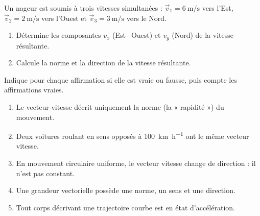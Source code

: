 \documentclass[11pt,a4paper]{article}
\newcommand{\vv}[1]{\vec{#1}}\newcommand{\ds}{\displaystyle}
\begin{document}
\begin{exo}
Un nageur est soumis à trois vitesses simultanées : $\vv{v}_1=\qty{6}{\metre\per\second}$ vers l'Est,
$\vv{v}_2=\qty{2}{\metre\per\second}$ vers l'Ouest et $\vv{v}_3=\qty{3}{\metre\per\second}$ vers le Nord.
\begin{enumerate}[label=\alph*)]
  \item Détermine les composantes $v_x$ (Est$-$Ouest) et $v_y$ (Nord) de la vitesse résultante.
  \item Calcule la norme et la direction de la vitesse résultante.
\end{enumerate}
\end{exo}

\begin{exo}
Indique pour chaque affirmation si elle est vraie ou fausse, puis compte les affirmations vraies.
\begin{enumerate}[label=\alph*)]
  \item Le vecteur vitesse décrit uniquement la norme (la « rapidité ») du mouvement.
  \item Deux voitures roulant en sens opposés à \qty{100}{\kilo\metre\per\hour} ont le même vecteur vitesse.
  \item En mouvement circulaire uniforme, le vecteur vitesse change de direction : il n'est pas constant.
  \item Une grandeur vectorielle possède une norme, un sens et une direction.
  \item Tout corps décrivant une trajectoire courbe est en état d'accélération.
\end{enumerate}
\end{exo}
\end{document}
